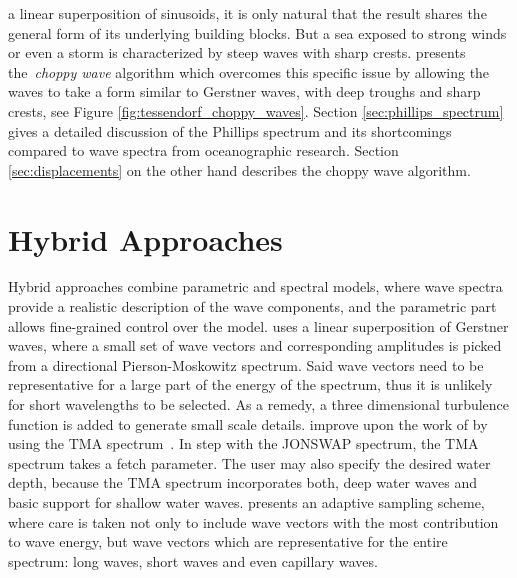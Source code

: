 a linear superposition of sinusoids, it is only natural that the result shares
the general form of its underlying building blocks. But a sea exposed to strong
winds or even a storm is characterized by steep waves with sharp crests.
\cite{course:simulatingocean} presents the~\emph{choppy wave} algorithm which
overcomes this specific issue by allowing the waves to take a form similar to
Gerstner waves, with deep troughs and sharp crests, see Figure
\ref{fig:tessendorf_choppy_waves}.
Section \ref{sec:phillips_spectrum} gives a detailed discussion of the Phillips
spectrum and its shortcomings compared to wave spectra from oceanographic
research. Section \ref{sec:displacements} on the other hand describes the choppy
wave algorithm.

\section{Hybrid Approaches}
Hybrid approaches combine parametric and spectral models, where wave spectra
provide a realistic description of the wave components, and the parametric part
allows fine-grained control over the model.
\citeauthor{Thon:2000}\citep{Thon:2000,Thon:2002} uses a linear superposition
of Gerstner waves, where a small set of wave vectors and corresponding
amplitudes is picked from a directional Pierson-Moskowitz spectrum. Said wave
vectors need to be representative for a large part of the energy of the
spectrum, thus it is unlikely for short wavelengths to be selected. As a remedy,
a three dimensional turbulence function \citep{Perlin:1985} is added to generate
small scale details. \cite{lee:2007} improve upon the work of
\citeauthor{Thon:2000} by using the TMA spectrum~\citep{Hughes:1984}. In step
with the JONSWAP spectrum, the TMA spectrum takes a fetch parameter. The user
may also specify the desired water depth, because the TMA spectrum incorporates
both, deep water waves and basic support for shallow water waves.
\cite{article:frechot2007} presents an adaptive sampling scheme, where care is
taken not only to include wave vectors with the most contribution to wave
energy, but wave vectors which are representative for the entire spectrum:
long waves, short waves and even capillary waves.


















